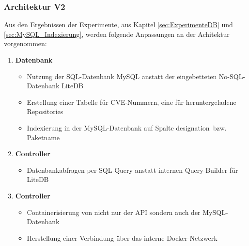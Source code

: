 \subsubsection{Architektur V2} \label{sec:Architektur}
    Aus den Ergebnissen der Experimente, aus Kapitel \ref{sec:ExperimenteDB} und \ref{sec:MySQL_Indexierung}, werden folgende Anpassungen an der Achitektur vorgenommen:
    \begin{enumerate}
        \item \textbf{Datenbank}
            \begin{itemize}
                \item Nutzung der SQL-Datenbank MySQL anstatt der eingebetteten No-SQL-Datenbank LiteDB
                \item Erstellung einer Tabelle für \ac{CVE}-Nummern, eine für heruntergeladene Repositories
                \item Indexierung in der MySQL-Datenbank auf Spalte \glqq designation\grqq~bzw. Paketname
            \end{itemize}
        \item \textbf{Controller}
            \begin{itemize}
                \item Datenbankabfragen per SQL-Query anstatt internen Query-Builder für LiteDB
            \end{itemize}
        \item \textbf{Controller}
            \begin{itemize}
                \item Containerisierung von nicht nur der \ac{API} sondern auch der MySQL-Datenbank
                \item Herstellung einer Verbindung über das interne Docker-Netzwerk
            \end{itemize}
    \end{enumerate}